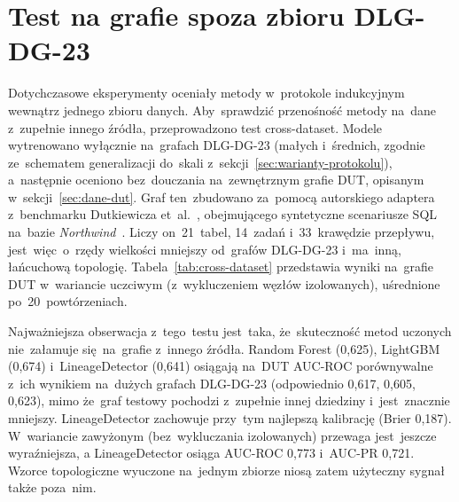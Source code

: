 \documentclass[polish,master,a4paper,oneside]{ppfcmthesis}
\renewcommand{\_}{\origtextunderscore\ifmmode\else\allowbreak\fi}
\begin{document}
\section{Test na grafie spoza zbioru DLG-DG-23}
\label{sec:cross_dataset}

Dotychczasowe eksperymenty oceniały metody w~protokole indukcyjnym wewnątrz
jednego zbioru danych. Aby~sprawdzić przenośność metody na~dane z~zupełnie
innego źródła, przeprowadzono test cross-dataset. Modele wytrenowano wyłącznie
na~grafach DLG-DG-23 (małych i~średnich, zgodnie ze~schematem generalizacji
do~skali z~sekcji~\ref{sec:warianty-protokolu}), a~następnie oceniono
bez~douczania na~zewnętrznym grafie DUT, opisanym w~sekcji~\ref{sec:dane-dut}.
Graf ten~zbudowano za~pomocą autorskiego adaptera z~benchmarku Dutkiewicza
et~al.~\cite{Dutkiewicz2026}, obejmującego syntetyczne scenariusze SQL na~bazie
\emph{Northwind}~\cite{Northwind}. Liczy on~21~tabel, 14~zadań i~33~krawędzie
przepływu, jest~więc~o~rzędy wielkości mniejszy od~grafów DLG-DG-23 i~ma~inną,
łańcuchową topologię. Tabela~\ref{tab:cross-dataset} przedstawia wyniki
na~grafie DUT w~wariancie uczciwym (z~wykluczeniem węzłów izolowanych),
uśrednione po~20~powtórzeniach.

Najważniejsza obserwacja z~tego~testu jest~taka, że~skuteczność metod uczonych
nie~załamuje się~na~grafie z~innego źródła. Random Forest (0{,}625),
LightGBM (0{,}674) i~LineageDetector (0{,}641) osiągają na~DUT AUC-ROC
porównywalne z~ich wynikiem na~dużych grafach DLG-DG-23 (odpowiednio
0{,}617, 0{,}605, 0{,}623), mimo że~graf testowy pochodzi z~zupełnie innej
dziedziny i~jest~znacznie mniejszy. LineageDetector zachowuje przy~tym
najlepszą kalibrację (Brier 0{,}187). W~wariancie zawyżonym
(bez~wykluczania izolowanych) przewaga jest~jeszcze wyraźniejsza, a
LineageDetector osiąga AUC-ROC 0{,}773 i~AUC-PR 0{,}721. Wzorce topologiczne
wyuczone na~jednym zbiorze niosą zatem użyteczny sygnał także poza~nim.
\end{document}
